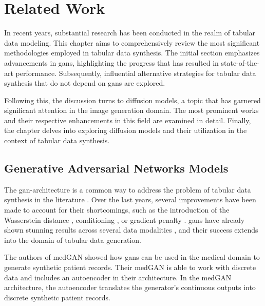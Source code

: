 \chapter{Related Work}
\label{ch:relatedWork}

In recent years, substantial research has been conducted in the realm of tabular data modeling. 
This chapter aims to comprehensively review the most significant methodologies employed in tabular data synthesis. 
The initial section emphasizes advancements in \glspl{gan}, highlighting the progress that has resulted in state-of-the-art performance. 
Subsequently, influential alternative strategies for tabular data synthesis that do not depend on \glspl{gan} are explored.

Following this, the discussion turns to diffusion models, a topic that has garnered significant attention in the image generation domain. 
The most prominent works and their respective enhancements in this field are examined in detail.
Finally, the chapter delves into exploring diffusion models and their utilization in the context of tabular data synthesis.

\section{Generative Adversarial Networks Models}
\label{ch:relatedWork-generativeAdversarialNetworksModels}

The \gls{gan}-architecture is a common way to address the problem of tabular data synthesis in the literature \cite{borisov2022DeepNeuralNetworks}.
Over the last years, several improvements have been made to account for their shortcomings, such as the introduction of the Wasserstein \cite{frogner2015LearningWassersteinLoss} distance \cite{arjovsky2017WassersteinGenerativeAdversarial}, conditioning \cite{mirza2014ConditionalGenerativeAdversarial}, or gradient penalty \cite{gulrajani2017ImprovedTrainingWasserstein}.
\Glspl{gan} have already shown stunning results across several data modalities \cite{mckeever2020SynthesisingTabularDatasets}, and their success extends into the domain of tabular data generation.

The authors of medGAN \cite{choi2017GeneratingMultilabelDiscrete} showed how \glspl{gan} can be used in the medical domain to generate synthetic patient records.
Their medGAN is able to work with discrete data and includes an autoencoder in their architecture.
In the medGAN architecture, the autoencoder translates the generator's continuous outputs into discrete synthetic patient records.

